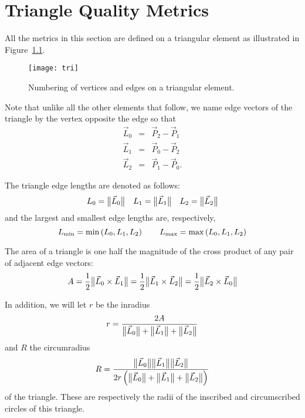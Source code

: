 \chapter{Triangle Quality Metrics}

All the metrics in this section are defined on a triangular element
as illustrated in Figure~\ref{f:tri}.

\begin{figure}[bhp]
  \centering
  \texttt{[image: tri]}
  \caption{Numbering of vertices and edges on a triangular element.%
                                                                  \label{f:tri}}
\end{figure}

Note that unlike all the other elements that follow,
we name edge vectors of the triangle by the vertex opposite the edge so that
\begin{equation*}
\begin{array}{lcl}
  \vec L_0 &=& \vec P_2 - \vec P_1\\
  \vec L_1 &=& \vec P_0 - \vec P_2\\
  \vec L_2 &=& \vec P_1 - \vec P_0.
\end{array}
\end{equation*}

The triangle edge lengths are denoted as follows:
\[
L_0 = \big\lVert{\vec L_0}\big\rVert\quad
L_1 = \big\lVert{\vec L_1}\big\rVert\quad
L_2 = \big\lVert{\vec L_2}\big\rVert
\]
and the largest and smallest edge lengths are, respectively,
\[
L_{\min} = \min\left(L_0, L_1, L_2\right)
  \rule{2em}{0pt}
L_{\max} = \max\left(L_0, L_1, L_2\right)
\]

The area of a triangle is one half the magnitude of the cross product of any pair of adjacent edge vectors:
\begin{equation*}
  A
    = \frac{1}{2}\big\lVert{\vec L_0\times\vec L_1}\big\rVert
    = \frac{1}{2}\big\lVert{\vec L_1\times\vec L_2}\big\rVert
    = \frac{1}{2}\big\lVert{\vec L_2\times\vec L_0}\big\rVert
\end{equation*}

In addition, we will let $r$ be the inradius
\begin{equation*}
\label{eq:Arp}
  r = \frac{2A}{\big\lVert{\vec L_0}\big\rVert + \big\lVert{\vec L_1}\big\rVert + \big\lVert{\vec L_2}\big\rVert}
\end{equation*}
and $R$ the circumradius
\[
  R = \frac{\normvec{L_0} \normvec{L_1} \normvec{L_2}}%
           {2 r \left(\normvec{L_0} + \normvec{L_1} + \normvec{L_2}\right)}
\]
of the triangle.
These are respectively the radii of the inscribed and circumscribed circles of this triangle.

